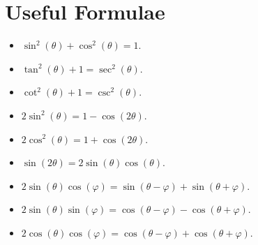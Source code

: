 \documentclass[12pt]{amsart}
\begin{document}
\section{Useful Formulae}

\begin{itemize}
\item
  $\sin^2(\theta) + \cos^2(\theta) = 1$.
\item
  $\tan^2(\theta) + 1 = \sec^2(\theta)$.
\item
  $\cot^2(\theta) + 1 = \csc^2(\theta)$.
\item
  $2\sin^2(\theta) = 1 - \cos(2\theta)$.
\item
  $2\cos^2(\theta) = 1 + \cos(2\theta)$.
\item
  $\sin(2\theta) = 2\sin(\theta)\cos(\theta)$.
\item
  $2\sin(\theta)\cos(\varphi) = \sin(\theta - \varphi) + \sin(\theta + \varphi)$.
\item
  $2\sin(\theta)\sin(\varphi) = \cos(\theta - \varphi) - \cos(\theta + \varphi)$.
\item
  $2\cos(\theta)\cos(\varphi) = \cos(\theta - \varphi) + \cos(\theta + \varphi)$.
\end{itemize}
\end{document}
